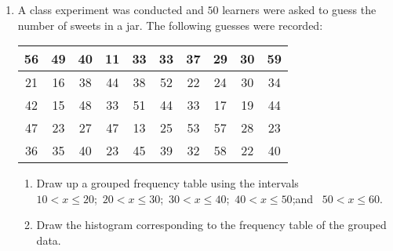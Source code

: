 \begin{exercises}{}{
    \begin{enumerate}[itemsep=5pt, label=\textbf{\arabic*}. ]
    \item  A class experiment was conducted and $50$ learners were asked to
      guess the number of sweets in a jar. The following guesses were
      recorded:
      \\
      \begin{center}
        \begin{tabular}{|c|c|c|c|c|c|c|c|c|c|} \hline
          56 & 49 & 40 & 11 & 33 & 33 & 37 & 29 & 30 & 59 \\ \hline
          21 & 16 & 38 & 44 & 38 & 52 & 22 & 24 & 30 & 34 \\\hline
          42 & 15 & 48 & 33 & 51 & 44 & 33 & 17 & 19 & 44 \\\hline
          47 & 23 & 27 & 47 & 13 & 25 & 53 & 57 & 28 & 23 \\\hline
          36 & 35 & 40 & 23 & 45 & 39 & 32 & 58 & 22 & 40 \\\hline
        \end{tabular}
      \end{center}
      \begin{enumerate}[noitemsep, label=\textbf{(\alph*)} ]
      \item
        Draw up a grouped frequency table using the intervals\\
        $10 < x \leq 20$;\ $20 < x \leq 30$;\ $30 < x \leq 40$;\ 
        $40 < x \leq 50$;and \ $50 < x \leq 60$.
      \item Draw the histogram corresponding to the frequency table of the
        grouped data.
      \end{enumerate}
    \end{enumerate}
}
\end{exercises}


